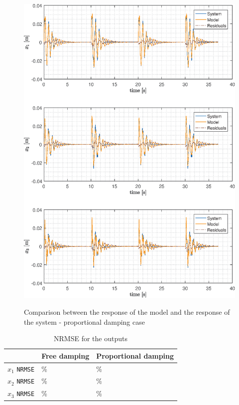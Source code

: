 \documentclass[twosided,a4paper]{article}           %
\begin{document}
\begin{figure}[H]
	\centering
	\caption{Comparison between the response of the model and the response of the system - proportional damping case}
	\includegraphics[width=\linewidth]{img/compare_p}
	\label{fig:compare_p}
\end{figure}

\begin{table}[]
	\centering
	\caption{NRMSE for the outputs}
	\label{tab:fit_all}
	\begin{tabular}{l|l|l|}
		\cline{2-3}
		& Free damping  & Proportional damping \\ \hline
		\multicolumn{1}{|l|}{$x_1$ \texttt{NRMSE} } &  \%        &          \%             \\ \hline
		\multicolumn{1}{|l|}{$x_2$ \texttt{NRMSE} } &   \%             &        \%           \\ \hline
		\multicolumn{1}{|l|}{$x_3$ \texttt{NRMSE} } &    \%  &
		 \%                              \\ \hline
	\end{tabular}
\end{table}
\end{document}
